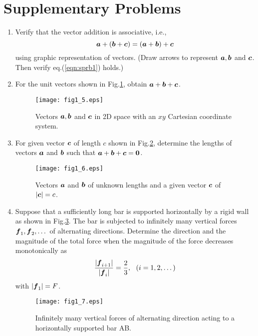 \documentclass[10pt,a4j]{article}
\begin{document}
\section{Supplementary Problems}
\begin{enumerate}
\item
    Verify that the vector addition is associative, i.e., 
    \begin{equation}
        \mbox{\boldmath $a$}+(\mbox{\boldmath $b$}+\mbox{\boldmath $c$})= (\mbox{\boldmath $a$}+\mbox{\boldmath $b$})+\mbox{\boldmath $c$}
    \label{eqn:sprb1}
    \end{equation}
    using graphic representation of vectors. 
		(Draw arrows to represent $\mbox{\boldmath $a$},\mbox{\boldmath $b$}$ and $\mbox{\boldmath $c$}$. Then verify eq.(\ref{eqn:sprb1}) holds.)
\item
    For the unit vectors shown in Fig.\ref{fig:fig1_5}, obtain $\mbox{\boldmath $a$}+\mbox{\boldmath $b$}+\mbox{\boldmath $c$}$.  
    \begin{figure}[h]
    \begin{center}
    \texttt{[image: fig1\_5.eps]} 
    \end{center}
    \caption{Vectors $\mbox{\boldmath $a$}, \mbox{\boldmath $b$}$ and $\mbox{\boldmath $c$}$ in 2D space with an $xy$ Cartesian coordinate system.}
    \label{fig:fig1_5}
    \end{figure}
\item
    For given vector $\mbox{\boldmath $c$}$ of length $c$ shown in Fig.\ref{fig:fig1_6}, determine the lengths of vectors 
    $\mbox{\boldmath $a$}$ and $\mbox{\boldmath $b$}$ such that $\mbox{\boldmath $a$}+\mbox{\boldmath $b$}+\mbox{\boldmath $c$}=\mbox{\boldmath $0$}$.
    \begin{figure}[h]
    \begin{center}
    \texttt{[image: fig1\_6.eps]} 
    \end{center}
        \caption{
            Vectors $\mbox{\boldmath $a$}$ and $\mbox{\boldmath $b$}$ of unknown lengths and a given vector $\mbox{\boldmath $c$}$ of $|\mbox{\boldmath $c$}|=c$.} 
    \label{fig:fig1_6}
    \end{figure}
\item
    Suppose that a sufficiently long bar is supported horizontally by a rigid wall as shown in Fig.\ref{fig:fig1_7}. The bar is subjected to infinitely many vertical forces $\mbox{\boldmath $f$}_1,\mbox{\boldmath $f$}_2,\dots $ of alternating directions. Determine the direction and the magnitude of the total force when the magnitude of the force decreases monotonically as 
    \begin{equation}
        \frac{| \mbox{\boldmath $f$}_{i+1}|}{|\mbox{\boldmath $f$}_i|}=\frac{2}{3}, \ \ (i=1,2,\dots)
        \label{eqn:}
    \end{equation}
 with $|\mbox{\boldmath $f$}_1|=F$.
    \begin{figure}[h]
    \begin{center}
    \texttt{[image: fig1\_7.eps]} 
    \end{center}
    \caption{Infinitely many vertical forces of alternating direction acting to a horizontally supported bar AB.}
    \label{fig:fig1_7}
    \end{figure}
\end{enumerate}
\end{document}
